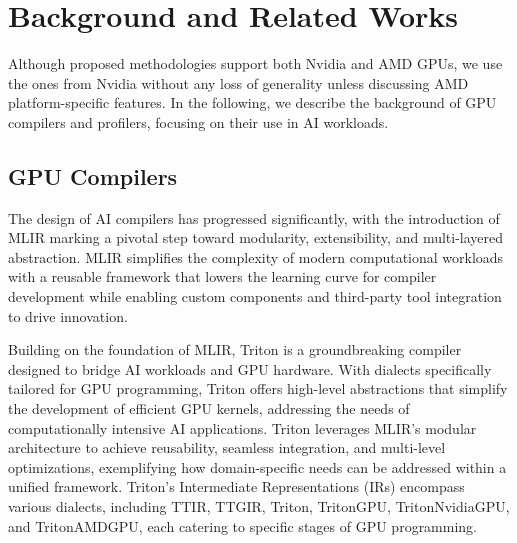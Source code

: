\section{Background and Related Works} \label{sec:background}
Although proposed methodologies support both Nvidia and AMD GPUs, we use the ones from Nvidia without any loss of generality unless discussing AMD platform-specific features.
In the following, we describe the background of GPU compilers and profilers, focusing on their use in AI workloads.

\subsection{GPU Compilers}

The design of AI compilers has progressed significantly, with the introduction of MLIR\cite{lattner2021mlir} marking a pivotal step toward modularity, extensibility, and multi-layered abstraction. 
MLIR simplifies the complexity of modern computational workloads with a reusable framework that lowers the learning curve for compiler development while enabling custom components and third-party tool integration to drive innovation.

Building on the foundation of MLIR, Triton\cite{tillet2019triton} is a groundbreaking compiler designed to bridge AI workloads and GPU hardware. 
With dialects specifically tailored for GPU programming, Triton offers high-level abstractions that simplify the development of efficient GPU kernels, addressing the needs of computationally intensive AI applications. 
Triton leverages MLIR’s modular architecture to achieve reusability, seamless integration, and multi-level optimizations, exemplifying how domain-specific needs can be addressed within a unified framework.
Triton's Intermediate Representations (IRs) encompass various dialects, including TTIR, TTGIR, Triton, TritonGPU, TritonNvidiaGPU, and TritonAMDGPU, each catering to specific stages of GPU programming. 


